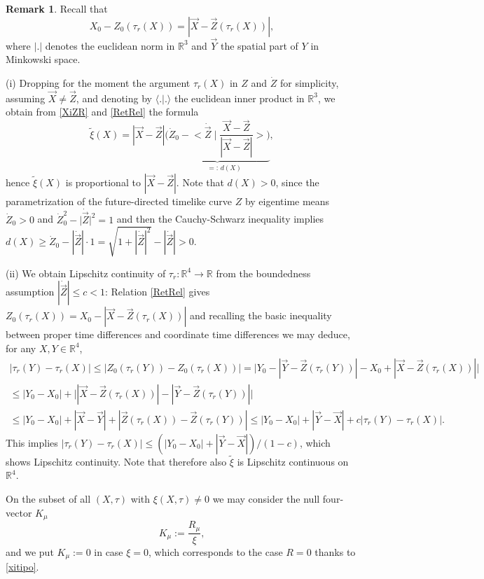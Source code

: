 \documentclass[sumlimits,intlimits,namelimits%
]{amsart}
\newcommand{\mb}[1]{\ensuremath{\mathbb{#1}}}
\newcommand{\R}{\mb{R}}
\theoremstyle{definition}
\newtheorem{remark}[theorem]{Remark}
\newcommand{\beq}{\begin{equation}}
\newcommand{\eeq}{\end{equation}}
\newcommand{\col}{\colon}
\newcommand{\inp}[2]{\langle #1 | #2 \rangle}  %
\begin{document}
\begin{remark}\label{XiTauRem}  Recall that 
\beq\label{RetRel}
   X_0 - Z_0(\tau_r(X)) = |\vec{X} - \vec{Z}(\tau_r(X))|,
\eeq
where $|.|$ denotes the euclidean norm in $\R^3$ and $\vec{Y}$ the spatial part of $Y$ in Minkowski space. 

(i) Dropping for the moment the argument $\tau_r(X)$ in $Z$ and $\dot{Z}$ for simplicity, assuming $\vec{X} \neq \vec{Z}$, and denoting by $\inp{.}{.}$ the euclidean inner product in $\R^3$, we obtain from \eqref{XiZR} and \eqref{RetRel} the formula
$$
      \widetilde{\xi}(X)  = |\vec{X} - \vec{Z}|  
      \underbrace{\Big( \dot{Z}_0 - \Big< \dot{\vec{Z}} \mid\frac{\vec{X} - \vec{Z}}{ |\vec{X} - \vec{Z}|} \Big> \Big)}_{\qquad =: \, d(X)},
$$
hence $ \widetilde{\xi}(X)$ is proportional to $|\vec{X} - \vec{Z}|$. 
Note that $d(X) > 0$, since the parametrization of the future-directed timelike curve $Z$ by eigentime means $\dot{Z}_0 > 0$ and $\dot{Z}_0^2 - \big|\dot{\vec{Z}}\big|^2 = 1$ and then the Cauchy-Schwarz inequality implies $d(X) \geq \dot{Z}_0 - |\dot{\vec{Z}}| \cdot 1 = \sqrt{1 +  |\dot{\vec{Z}}|^2} -  |\dot{\vec{Z}}| > 0$. 

(ii) We obtain Lipschitz continuity of $\tau_r \col \R^4 \to \R$ from the boundedness assumption $|\dot{\vec{Z}}| \leq c < 1$: Relation \eqref{RetRel} gives 
$Z_0(\tau_r(X)) = X_0 - |\vec{X} - \vec{Z}(\tau_r(X))|$ and recalling the basic inequality between proper time differences and coordinate time differences we may deduce, for any $X, Y \in \R^4$,
\begin{multline*}
   |\tau_r(Y) - \tau_r(X)| \leq |Z_0(\tau_r(Y)) - Z_0(\tau_r(X))| = \Big|Y_0 - |\vec{Y} - \vec{Z}(\tau_r(Y))|
        - X_0 + |\vec{X} - \vec{Z}(\tau_r(X))| \Big|\\
        \leq |Y_0 - X_0| + \Big|  |\vec{X} - \vec{Z}(\tau_r(X))| - |\vec{Y} - \vec{Z}(\tau_r(Y))|  \Big|\\ 
        \leq  |Y_0 - X_0| + |\vec{X} - \vec{Y}| + | \vec{Z}(\tau_r(X)) - \vec{Z}(\tau_r(Y))|
           \leq  |Y_0 - X_0| + |\vec{Y} - \vec{X}| + c  |\tau_r(Y) - \tau_r(X)|.
\end{multline*}
This implies $ |\tau_r(Y) - \tau_r(X)| \leq ( |Y_0 - X_0| + |\vec{Y} - \vec{X}|)/(1-c)$, which shows Lipschitz continuity. Note that therefore also $\widetilde{\xi}$ is Lipschitz continuous on $\R^4$.

\end{remark}


On the subset of all $(X,\tau)$ with $\xi(X,\tau) \neq 0$ we may consider the null four-vector $K_\mu$ 
 \[
K_\mu := \frac{R_\mu}{\xi},
\]
 and we put $K_\mu := 0$ in case $\xi = 0$, which corresponds to the case $R = 0$ thanks to \eqref{xitipo}. 
 
\end{document}
